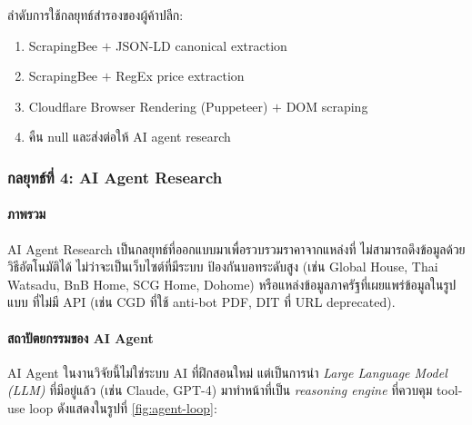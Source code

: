 ลำดับการใช้กลยุทธ์สำรองของผู้ค้าปลีก:
\begin{enumerate}[leftmargin=2em,itemsep=0.2em]
  \item ScrapingBee $+$ JSON-LD canonical extraction
  \item ScrapingBee $+$ RegEx price extraction
  \item Cloudflare Browser Rendering (Puppeteer) $+$ DOM scraping
  \item คืน null และส่งต่อให้ AI agent research
\end{enumerate}

\subsubsection{กลยุทธ์ที่ 4: AI Agent Research}

\paragraph{ภาพรวม}

AI Agent Research เป็นกลยุทธ์ที่ออกแบบมาเพื่อรวบรวมราคาจากแหล่งที่
ไม่สามารถดึงข้อมูลด้วยวิธีอัตโนมัติได้ ไม่ว่าจะเป็นเว็บไซต์ที่มีระบบ
ป้องกันบอทระดับสูง (เช่น Global House, Thai Watsadu, BnB Home,
SCG Home, Dohome) หรือแหล่งข้อมูลภาครัฐที่เผยแพร่ข้อมูลในรูปแบบ
ที่ไม่มี API (เช่น CGD ที่ใช้ anti-bot PDF, DIT ที่ URL deprecated).

\paragraph{สถาปัตยกรรมของ AI Agent}

AI Agent ในงานวิจัยนี้ไม่ใช่ระบบ AI ที่ฝึกสอนใหม่ แต่เป็นการนำ
\emph{Large Language Model (LLM)} ที่มีอยู่แล้ว (เช่น Claude, GPT-4)
มาทำหน้าที่เป็น \emph{reasoning engine} ที่ควบคุม tool-use loop
ดังแสดงในรูปที่ \ref{fig:agent-loop}:



